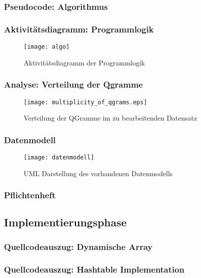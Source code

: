 \subsubsection{Pseudocode: Algorithmus}
\subsubsection{Aktivitätsdiagramm: Programmlogik}
\begin{figure}[!htp]
    \caption{Aktivitätsdiagramm der Programmlogik}
    \label{programmlogik}
    \texttt{[image: algo]}
    \centering
\end{figure}

\subsubsection{Analyse: Verteilung der Qgramme}
\begin{figure}[!htp]
    \caption{Verteilung der QGramme im zu bearbeitenden Datensatz}
    \label{qgram_verteilung}
    \texttt{[image: multiplicity\_of\_qgrams.eps]}
    \centering
\end{figure}

\subsubsection{Datenmodell}
\begin{figure}[!htp]
    \caption{UML Darstellung des vorhandenen Datenmodells}
    \label{qgram_verteilung}
    \texttt{[image: datenmodell]}
    \centering
\end{figure}

\subsubsection{Pflichtenheft}

\subsection{Implementierungsphase}
\subsubsection{Quellcodeauszug: Dynamische Array}


\subsubsection{Quellcodeauszug: Hashtable Implementation}


